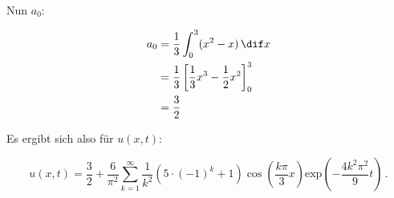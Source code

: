 Nun $a_0$:

\begin{align*}
    a_0 &= \frac{1}{3}\int_0^3 (x^2-x) \,\dif x \\
        &= \frac{1}{3} \left[\frac{1}{3}x^3 - \frac{1}{2}x^2\right]_0^3 \\
        &= \frac{3}{2}
\end{align*}

Es ergibt sich also für $u(x,t)$:

\begin{equation*}
    u(x,t) = \frac{3}{2} + \frac{6}{\pi^2}\sum_{k=1}^\infty \frac{1}{k^2} (5 \cdot (-1)^k + 1) \cos\left(\frac{k\pi}{3}x\right) \text{exp}\left(-\frac{4k^2\pi^2}{9}t\right) \,.
\end{equation*}
